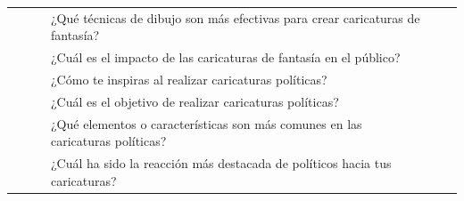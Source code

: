 \documentclass[12pt,a4paper]{article}
\begin{document}
\begin{landscape}
\begin{table}[ht!]
\begin{tabular}{clllcc}
			                                                       &                           & \multirow{2}{*}{\gbbbbbbbb}         & ¿Qué técnicas de dibujo son más efectivas para crear caricaturas de fantasía?                          &                                                                                                                                                        \\\cline{4-4}
			                                                       &                           &                                     & ¿Cuál es el impacto de las caricaturas de fantasía en el público?                                      &                                                                                                                                                        \\\cline{2-4}
			                                                       & \multirow{7}{*}{\dimiii}  & \multirow{2}{*}{\gbbbbbbbbb}        & ¿Cómo te inspiras al realizar caricaturas políticas?                                                   &                                                                                                                                                        \\\cline{4-4}
			                                                       &                           &                                     & ¿Cuál es el objetivo de realizar caricaturas políticas?                                                &                                                                                                                                                        \\\cline{3-4}
			                                                       &                           & \multirow{1}{*}{\gbbbbbbbbbb}       & ¿Qué elementos o características son más comunes en las caricaturas políticas?                         &                                                                                                                                                        \\\cline{3-4}
			                                                       &                           & \multirow{2}{*}{\gbbbbbbbbbbb}      & ¿Cuál ha sido la reacción más destacada de políticos hacia tus caricaturas?                            &                                                                                                                                                        \\\cline{4-4}

\end{tabular}
\end{table}
\end{landscape}
\end{document}
